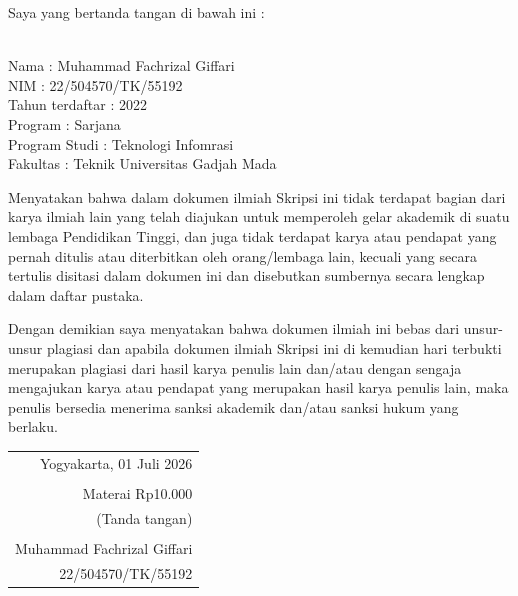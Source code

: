 \noindent Saya yang bertanda tangan di bawah ini :

\vspace{-1em}

\begin{tabbing}
	\hspace{40mm} \= \\ %
	\noindent Nama \> : Muhammad Fachrizal Giffari\\[\parskip]
	\noindent NIM \> : 22/504570/TK/55192\\[\parskip]
	\noindent Tahun terdaftar \> : 2022\\[\parskip]
	\noindent Program \> : Sarjana \\[\parskip]
	\noindent Program Studi \> : Teknologi Infomrasi\\[\parskip]
	\noindent Fakultas \> : Teknik Universitas Gadjah Mada
\end{tabbing}

\noindent Menyatakan bahwa dalam dokumen ilmiah Skripsi ini tidak terdapat bagian dari karya ilmiah lain yang telah diajukan untuk memperoleh gelar akademik di suatu lembaga Pendidikan Tinggi, dan juga tidak terdapat karya atau pendapat yang pernah ditulis atau diterbitkan oleh orang/lembaga lain, kecuali yang secara tertulis disitasi dalam dokumen ini dan disebutkan sumbernya secara lengkap dalam daftar pustaka.

\noindent Dengan demikian saya menyatakan bahwa dokumen ilmiah ini bebas dari unsur-unsur plagiasi dan apabila dokumen ilmiah Skripsi ini di kemudian hari terbukti merupakan plagiasi dari hasil karya penulis lain dan/atau dengan sengaja mengajukan karya atau pendapat yang merupakan hasil karya penulis lain, maka penulis bersedia menerima sanksi akademik dan/atau sanksi hukum yang berlaku.


\begin{flushright}
	\begin{tabular}{r}
		Yogyakarta, 01 Juli 2026   \\
		\vspace{0.1cm}             \\
		\tiny{Materai Rp10.000}    \\
		\tiny{(Tanda tangan)}      \\
		\vspace{0.1cm}             \\
		Muhammad Fachrizal Giffari \\ 22/504570/TK/55192
	\end{tabular}
\end{flushright}
